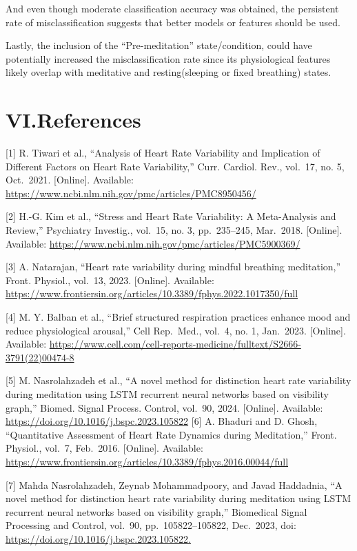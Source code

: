\documentclass[
  11pt,
]{ieee}
\begin{document}
And even though moderate classification accuracy was obtained, the
persistent rate of misclassification suggests that better models or
features should be used.

Lastly, the inclusion of the ``Pre-meditation'' state/condition, could
have potentially increased the misclassification rate since its
physiological features likely overlap with meditative and
resting(sleeping or fixed breathing) states.

\newpage

\section{VI.References}\label{vi.references}

{[}1{]} R. Tiwari et al., ``Analysis of Heart Rate Variability and
Implication of Different Factors on Heart Rate Variability,'' Curr.
Cardiol. Rev., vol.~17, no. 5, Oct.~2021. {[}Online{]}. Available:
\url{https://www.ncbi.nlm.nih.gov/pmc/articles/PMC8950456/}

{[}2{]} H.-G. Kim et al., ``Stress and Heart Rate Variability: A
Meta-Analysis and Review,'' Psychiatry Investig., vol.~15, no. 3,
pp.~235--245, Mar.~2018. {[}Online{]}. Available:
\url{https://www.ncbi.nlm.nih.gov/pmc/articles/PMC5900369/}

{[}3{]} A. Natarajan, ``Heart rate variability during mindful breathing
meditation,'' Front. Physiol., vol.~13, 2023. {[}Online{]}. Available:
\url{https://www.frontiersin.org/articles/10.3389/fphys.2022.1017350/full}

{[}4{]} M. Y. Balban et al., ``Brief structured respiration practices
enhance mood and reduce physiological arousal,'' Cell Rep.~Med., vol.~4,
no. 1, Jan.~2023. {[}Online{]}. Available:
\url{https://www.cell.com/cell-reports-medicine/fulltext/S2666-3791(22)00474-8}

{[}5{]} M. Nasrolahzadeh et al., ``A novel method for distinction heart
rate variability during meditation using LSTM recurrent neural networks
based on visibility graph,'' Biomed. Signal Process. Control, vol.~90,
2024. {[}Online{]}. Available:
\url{https://doi.org/10.1016/j.bspc.2023.105822} {[}6{]} A. Bhaduri and
D. Ghosh, ``Quantitative Assessment of Heart Rate Dynamics during
Meditation,'' Front. Physiol., vol.~7, Feb.~2016. {[}Online{]}.
Available:
\url{https://www.frontiersin.org/articles/10.3389/fphys.2016.00044/full}

{[}7{]} Mahda Nasrolahzadeh, Zeynab Mohammadpoory, and Javad Haddadnia,
``A novel method for distinction heart rate variability during
meditation using LSTM recurrent neural networks based on visibility
graph,'' Biomedical Signal Processing and Control, vol.~90,
pp.~105822--105822, Dec.~2023, doi:
\url{https://doi.org/10.1016/j.bspc.2023.105822.}
\end{document}
